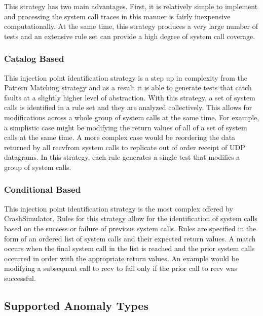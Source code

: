             This strategy has two main advantages. First, it is relatively simple to implement and processing the system
            call traces in this manner is fairly inexpensive computationally. At the same time, this strategy produces a
            very large number of tests and an extensive rule set can provide a high degree of system call coverage.

        \subsubsection{Catalog Based}

            This injection point identification strategy is a step up in complexity from the Pattern Matching strategy
            and as a result it is able to generate tests that catch faults at a slightly higher level of abstraction.
            With this strategy, a set of system calls is identified in a rule set and they are analyzed collectively.
            This allows for modifications across a whole group of system calls at the same time. For example, a
            simplistic case might be modifying the return values of all of a set of system calls at the same time. A
            more complex case would be reordering the data returned by all recvfrom system calls to replicate out of
            order receipt of UDP datagrams.  In this strategy, each rule generates a single test that modifies a group
            of system calls.

        \subsubsection{Conditional Based}

            This injection point identification strategy is the most complex offered by CrashSimulator. Rules for this
            strategy allow for the identification of system calls based on the success or failure of previous system calls.
            Rules are specified in the form of an ordered list of system calls and their expected return values. A match
            occurs when the final system call in the list is reached and the prior system calls occurred in order with the
            appropriate return values. An example would be modifying a subsequent call to recv to fail only if the prior
            call to recv was successful.

    \subsection{Supported Anomaly Types}

